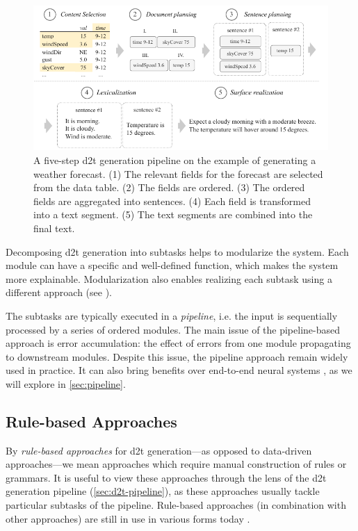 {\begin{figure}[t]
  \centering
  \includegraphics[width=\textwidth]{img/pipeline.pdf}

  \caption{A five-step \ac{d2t} generation pipeline on the example of generating a weather forecast. (1) The relevant fields for the forecast are selected from the data table. (2) The fields are ordered. (3) The ordered fields are aggregated into sentences. (4) Each field is transformed into a text segment. (5) The text segments are combined into the final text.}\label{fig:pipeline}

\end{figure}


Decomposing \ac{d2t} generation into subtasks helps to modularize the system. Each module can have a specific and well-defined function, which makes the system more explainable. Modularization also enables realizing each subtask using a different approach (see ).

The subtasks are typically executed in a \emph{pipeline}, i.e. the input is sequentially processed by a series of ordered modules. The main issue of the pipeline-based approach is error accumulation: the effect of errors from one module propagating to downstream modules. Despite this issue, the pipeline approach remain widely used in practice. It can also bring benefits over end-to-end neural systems \cite{ferreiraNeuralDatatotextGeneration2019}, as we will explore in \autoref{sec:pipeline}.


\subsection{Rule-based Approaches}
\label{sec:rule-d2t}

By \emph{rule-based approaches} for \ac{d2t} generation---as opposed to data-driven approaches---we mean approaches which require manual construction of rules or grammars. It is useful to view these approaches through the lens of the \ac{d2t} generation pipeline (\autoref{sec:d2t-pipeline}), as these approaches usually tackle particular subtasks of the pipeline. Rule-based approaches (in combination with other approaches) are still in use in various forms today \cite{gattSurveyStateArt2018,daleNaturalLanguageGeneration2020,daleNavigatingTextGeneration2023}.


}
